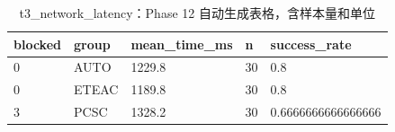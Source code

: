 \begin{table}[htbp]
\centering
\caption{t3_network_latency：Phase 12 自动生成表格，含样本量和单位}
\begin{tabular}{lllll}
\hline
blocked & group & mean_time_ms & n & success_rate \\
\hline
0 & AUTO & 1229.8 & 30 & 0.8 \\
0 & ETEAC & 1189.8 & 30 & 0.8 \\
3 & PCSC & 1328.2 & 30 & 0.6666666666666666 \\
\hline
\end{tabular}
\end{table}
